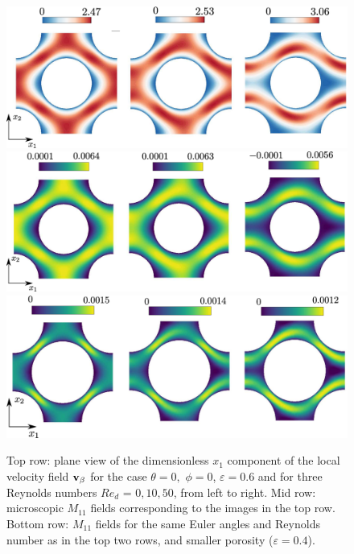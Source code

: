 \begin{figure}[H]
	\centering
	\includegraphics[width=1\textwidth]{chapter_4/figure/fig1}
	\includegraphics[width=1\textwidth]{chapter_4/figure/fig2}
	\includegraphics[width=1\textwidth]{chapter_4/figure/fig4}
	\caption{Top row: plane view of the dimensionless $x_1$ component of the local velocity field ${\textbf{v}_{\beta}}$ for the case $\theta=0,$ $\phi=0$, $\varepsilon=0.6$ and for three Reynolds numbers $Re_d$ = $0,10,50$, from left to right. Mid row: microscopic $M_{11}$ fields corresponding to the images in the top row. Bottom row: $M_{11}$ fields for the same Euler angles and Reynolds number as in the top two rows, and smaller porosity ($\varepsilon=0.4$).}
	\label{fig:1ch4}
\end{figure}


\newpage

